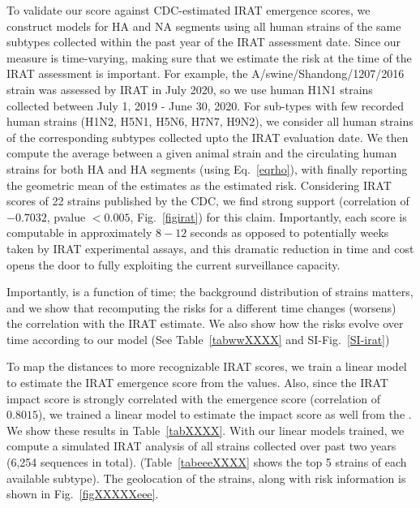 \documentclass[onecolumn, compsoc,10pt]{IEEEtran}
\begin{document}
To validate our score against CDC-estimated IRAT emergence scores, we construct \enet models for HA and NA segments using all human strains of the same  subtypes collected within the past year of the IRAT assessment date. Since our measure is time-varying, making sure that we estimate the risk at the time of the IRAT assessment is important. For example, the A/swine/Shandong/1207/2016 strain was assessed by IRAT in July 2020, so we  use human H1N1 strains collected  between July 1, 2019 - June 30, 2020. For sub-types with few recorded human strains (H1N2, H5N1, H5N6, H7N7, H9N2), we consider all human strains of the corresponding subtypes collected upto the IRAT evaluation date. We then compute the average \qdist between a given animal  strain  and the circulating human strains for both HA and HA segments (using Eq.~\eqref{eqrho}), with finally reporting the geometric mean of the estimates as the estimated risk. Considering IRAT scores of 22 strains published by the CDC, we find strong support  (correlation of $-0.7032$, pvalue $< 0.005$, Fig.~\ref{figirat}) for this claim. Importantly, each \erisk score  is  computable in approximately $8-12$ seconds as opposed to potentially weeks taken by IRAT experimental assays, and this dramatic reduction in time and cost  opens the door to fully exploiting the  current surveillance capacity.

Importantly,  \erisk is a function of time; the background distribution of strains matters, and
we show that recomputing the risks for a different time changes (worsens) the correlation with the IRAT estimate. We also show how the risks evolve over time according to our model (See Table~\ref{tabwwXXXX}  and SI-Fig.~\ref{SI-irat})

To map the \enet distances to more recognizable IRAT scores, we  train a linear model to estimate the IRAT emergence score from the \erisk values. Also, since the IRAT impact score is strongly correlated with the emergence score (correlation of $0.8015$), we  trained a linear model to estimate the impact score as well from the  \erisk. We show these results in Table~\ref{tabXXXX}. With our linear models trained, we compute a simulated IRAT analysis of all \infl strains collected over past two years (6,254 sequences in total). (Table~\ref{tabeeeXXXX} shows the top 5 strains of each available subtype). The geolocation of the strains, along with risk information is shown in Fig.~\ref{figXXXXXeee}.


\end{document}
